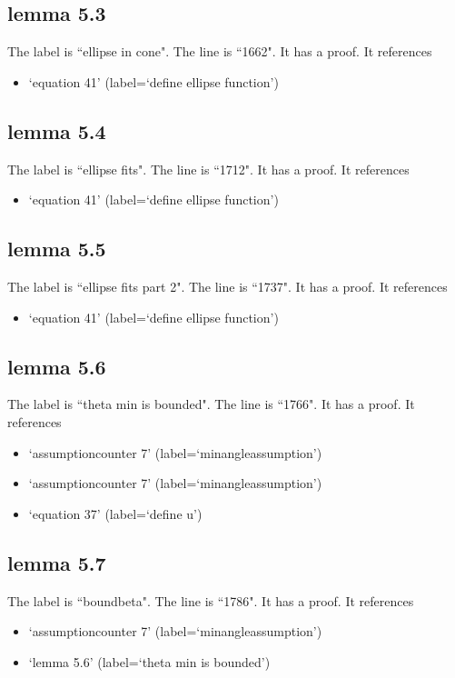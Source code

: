 \documentclass{article}
\begin{document}
\subsection{lemma 5.3}
The label is ``ellipse in cone".
The line is ``1662".
It has a proof.
It references \begin{itemize}
\item `equation 41' (label=`define ellipse function')
\end{itemize}
\subsection{lemma 5.4}
The label is ``ellipse fits".
The line is ``1712".
It has a proof.
It references \begin{itemize}
\item `equation 41' (label=`define ellipse function')
\end{itemize}
\subsection{lemma 5.5}
The label is ``ellipse fits part 2".
The line is ``1737".
It has a proof.
It references \begin{itemize}
\item `equation 41' (label=`define ellipse function')
\end{itemize}
\subsection{lemma 5.6}
The label is ``theta min is bounded".
The line is ``1766".
It has a proof.
It references \begin{itemize}
\item `assumptioncounter 7' (label=`minangleassumption')
\item `assumptioncounter 7' (label=`minangleassumption')
\item `equation 37' (label=`define u')
\end{itemize}
\subsection{lemma 5.7}
The label is ``boundbeta".
The line is ``1786".
It has a proof.
It references \begin{itemize}
\item `assumptioncounter 7' (label=`minangleassumption')
\item `lemma 5.6' (label=`theta min is bounded')
\end{itemize}
\end{document}
